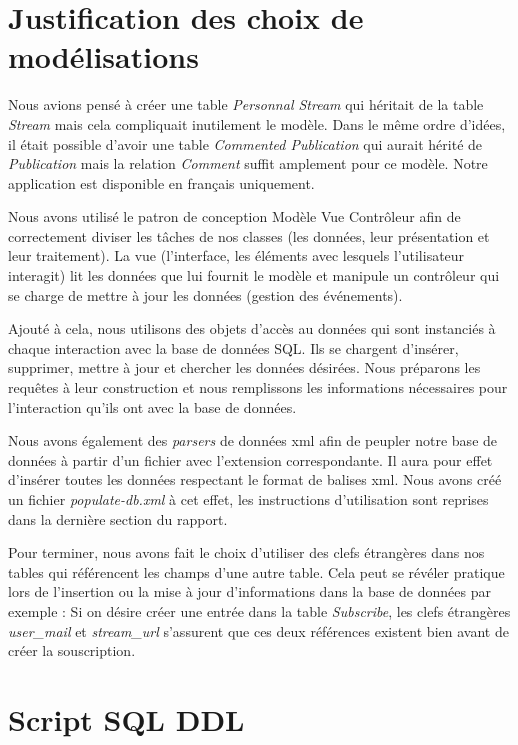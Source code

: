 \documentclass[a4paper,10pt]{article}
\begin{document}
\section{Justification des choix de modélisations}

Nous avions pensé à créer une table \textsl{Personnal Stream} qui héritait de la table \textsl{Stream} mais cela compliquait inutilement le modèle. Dans le même ordre d'idées, il était possible d'avoir une table \textsl{Commented Publication} qui aurait hérité de \textsl{Publication} mais la relation \textsl{Comment} suffit amplement pour ce modèle. Notre application est disponible en français uniquement.
\

Nous avons utilisé le patron de conception Modèle Vue Contrôleur afin de correctement diviser les tâches de nos classes (les données, leur présentation et leur traitement). La vue (l'interface, les éléments avec lesquels l'utilisateur interagit) lit les données que lui fournit le modèle et manipule un contrôleur qui se charge de mettre à jour les données (gestion des événements). 
\

Ajouté à cela, nous utilisons des objets d'accès au données qui sont instanciés à chaque interaction avec la base de données SQL. Ils se chargent d'insérer, supprimer, mettre à jour et chercher les données désirées. Nous préparons les requêtes à leur construction et nous remplissons les informations nécessaires pour l'interaction qu'ils ont avec la base de données.
\

Nous avons également des \textsl{parsers} de données xml afin de peupler notre base de données à partir d'un fichier avec l'extension correspondante. Il aura pour effet d'insérer toutes les données respectant le format de balises xml. Nous avons créé un fichier \textsl{populate-db.xml} à cet effet, les instructions d'utilisation sont reprises dans la dernière section du rapport.

Pour terminer, nous avons fait le choix d'utiliser des clefs étrangères dans nos tables qui référencent les champs d'une autre table. Cela peut se révéler pratique lors de l'insertion ou la mise à jour d'informations dans la base de données par exemple : Si on désire créer une entrée dans la table \textsl{Subscribe}, les clefs étrangères \textsl{user\_mail} et \textsl{stream\_url} s'assurent que ces deux références existent bien avant de créer la souscription.

\section{Script SQL DDL}
\end{document}
